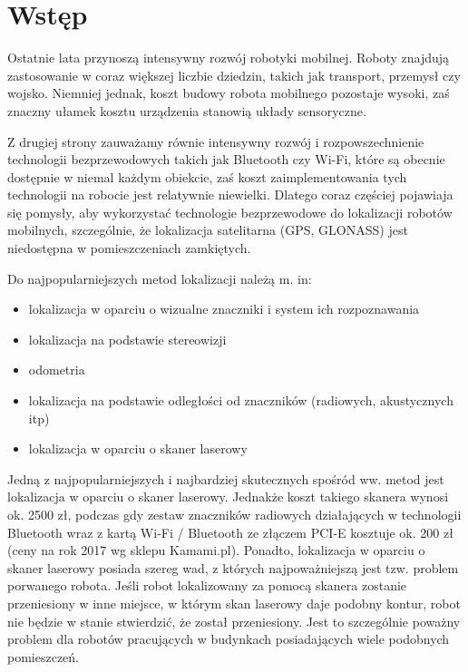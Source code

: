 \chapter{Wstęp}
\label{ch:wstep}
Ostatnie lata przynoszą intensywny rozwój robotyki mobilnej. Roboty znajdują zastosowanie w coraz większej liczbie dziedzin, takich jak transport, przemysł czy wojsko. Niemniej jednak, koszt budowy robota mobilnego pozostaje wysoki, zaś znaczny ułamek kosztu urządzenia stanowią układy sensoryczne. 

Z drugiej strony zauważamy równie intensywny rozwój i rozpowszechnienie technologii bezprzewodowych takich jak Bluetooth czy Wi-Fi, które są obecnie dostępnie w niemal każdym obiekcie, zaś koszt zaimplementowania tych technologii na robocie jest relatywnie niewielki. Dlatego coraz częściej pojawiaja się pomysły, aby wykorzystać technologie bezprzewodowe do lokalizacji robotów mobilnych, szczególnie, że lokalizacja satelitarna (GPS, GLONASS) jest niedostępna w pomieszczeniach zamkiętych.

Do najpopularniejszych metod lokalizacji należą m. in:
\begin{itemize}
 \item lokalizacja w oparciu o wizualne znaczniki i system ich rozpoznawania
 \item lokalizacja na podstawie stereowizji
 \item odometria
 \item lokalizacja na podstawie odległości od znaczników (radiowych, akustycznych itp)
 \item lokalizacja w oparciu o skaner laserowy
\end{itemize}

Jedną z najpopularniejszych i najbardziej skutecznych spośród ww. metod jest lokalizacja w oparciu o skaner laserowy. Jednakże koszt takiego skanera wynosi ok. 2500 zł, podczas gdy zestaw znaczników radiowych działających w technologii Bluetooth wraz z kartą Wi-Fi / Bluetooth ze złączem PCI-E kosztuje ok. 200 zł (ceny na rok 2017 wg sklepu Kamami.pl). Ponadto, lokalizacja w oparciu o skaner laserowy posiada szereg wad, z których najpoważniejszą jest tzw. problem porwanego robota. Jeśli robot lokalizowany za pomocą skanera zostanie przeniesiony w inne miejsce, w którym skan laserowy daje podobny kontur, robot nie będzie w stanie stwierdzić, że został przeniesiony. Jest to szczególnie poważny problem dla robotów pracujących w budynkach posiadających wiele podobnych pomieszczeń. 

